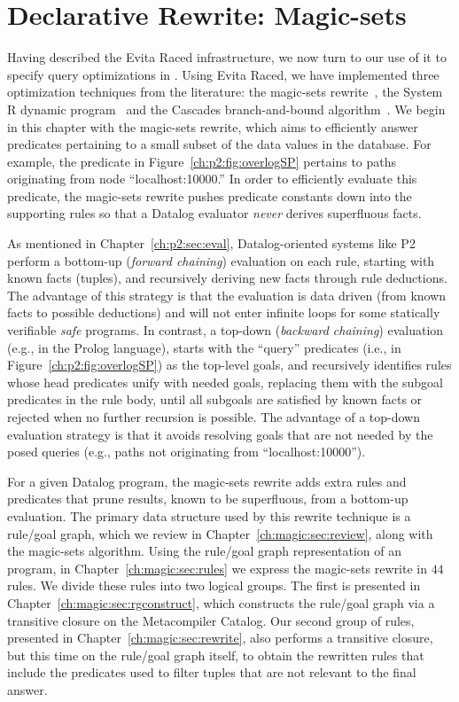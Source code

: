 \chapter[Declarative Rewrite: Magic-sets]{Declarative Rewrite: Magic-sets}
\label{ch:magic}

Having described the Evita Raced infrastructure, we now turn to our use of it
to specify query optimizations in \OVERLOG.  Using Evita Raced, we have
implemented three optimization techniques from the literature: the magic-sets
rewrite~\cite{magic-sets1, magic-sets2}, the System R dynamic
program~\cite{selinger} and the Cascades branch-and-bound
algorithm~\cite{cascades}.  We begin in this chapter with the magic-sets
rewrite, which aims to efficiently answer predicates pertaining to a small
subset of the data values in the database.  For example, the 
predicate in Figure~\ref{ch:p2:fig:overlogSP} pertains to paths originating
from node ``localhost:10000.'' In order to efficiently evaluate this predicate,
the magic-sets rewrite pushes predicate constants down into the supporting
rules so that a Datalog evaluator {\em never} derives superfluous facts.

As mentioned in Chapter~\ref{ch:p2:sec:eval}, Datalog-oriented systems like P2
perform a bottom-up ({\em forward chaining}) evaluation on each rule, starting
with known facts (tuples), and recursively deriving new facts through rule
deductions.  The advantage of this strategy is that the evaluation is data
driven (from known facts to possible deductions) and will not enter infinite
loops for some statically verifiable {\em safe} programs.  In contrast, a
top-down ({\em backward chaining}) evaluation (e.g., in the Prolog language),
starts with the ``query'' predicates (i.e., 
in Figure~\ref{ch:p2:fig:overlogSP}) as the top-level goals, and recursively
identifies rules whose head predicates unify with needed goals, replacing them
with the subgoal predicates in the rule body, until all subgoals are satisfied
by known facts or rejected when no further recursion is possible.  The
advantage of a top-down evaluation strategy is that it avoids resolving goals
that are not needed by the posed queries (e.g., paths not originating from
``localhost:10000'').

For a given Datalog program, the magic-sets rewrite adds extra rules and
predicates that prune results, known to be superfluous, from a bottom-up
evaluation.  The primary data structure used by this rewrite technique is a
rule/goal graph, which we review in Chapter~\ref{ch:magic:sec:review}, along
with the magic-sets algorithm.  Using the rule/goal graph representation of an
\OVERLOG program, in Chapter~\ref{ch:magic:sec:rules} we express the magic-sets
rewrite in $44$ \OVERLOG rules.  We divide these rules into two logical groups.
The first is presented in Chapter~\ref{ch:magic:sec:rgconstruct}, which
constructs the rule/goal graph via a transitive closure on the Metacompiler
Catalog.  Our second group of rules, presented in
Chapter~\ref{ch:magic:sec:rewrite}, also performs a transitive closure, but
this time on the rule/goal graph itself, to obtain the rewritten rules that
include the predicates used to filter tuples that are not relevant to the final
answer.

